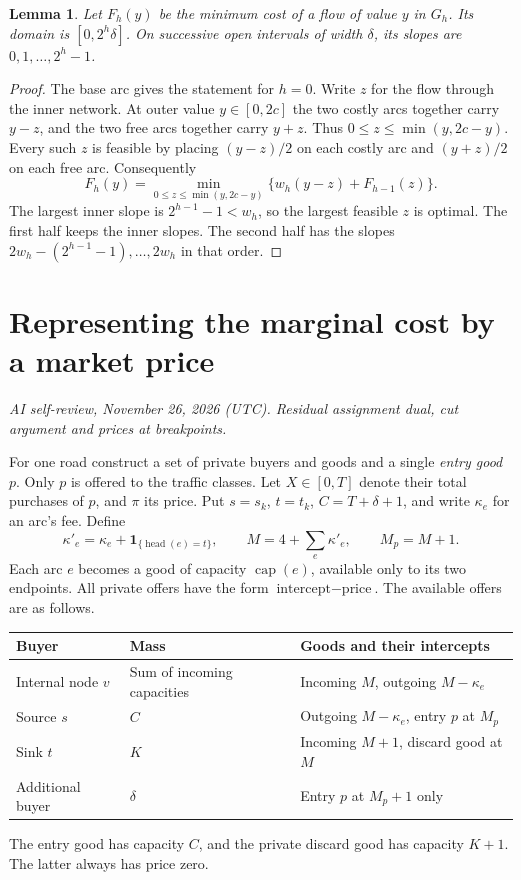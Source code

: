 \documentclass[11pt,oneside,openany,notitlepage]{report}
\newtheorem{lemma}[theorem]{Lemma}
\newcommand{\reviewdate}{November 26, 2026 (UTC)}
\newcommand{\reviewmark}[1]{\par\nopagebreak[4]\noindent
  {\footnotesize\itshape AI self-review, \reviewdate. #1\par}\nobreak\smallskip}
\DeclareMathOperator{\caparc}{cap}
\begin{document}
\begin{lemma}\label{lem:slopes}
Let \(F_h(y)\) be the minimum cost of a flow of value \(y\) in \(G_h\).
Its domain is \([0,2^h\delta]\). On successive open intervals of width
\(\delta\), its slopes are \(0,1,\ldots,2^h-1\).
\end{lemma}
\begin{proof}
The base arc gives the statement for \(h=0\). Write \(z\) for the flow
through the inner network. At outer value \(y\in[0,2c]\) the two costly
arcs together carry \(y-z\), and the two free arcs together carry \(y+z\).
Thus \(0\le z\le\min(y,2c-y)\). Every such \(z\) is feasible by placing
\((y-z)/2\) on each costly arc and \((y+z)/2\) on each free arc.
Consequently
\[
 F_h(y)=\min_{0\le z\le\min(y,2c-y)}
             \{w_h(y-z)+F_{h-1}(z)\}.
\]
The largest inner slope is \(2^{h-1}-1<w_h\), so the largest feasible \(z\)
is optimal. The first half keeps the inner slopes. The second half has the
slopes \(2w_h-(2^{h-1}-1),\ldots,2w_h\) in that order.
\end{proof}

\section{Representing the marginal cost by a market price}
\reviewmark{Residual assignment dual, cut argument and prices at breakpoints.}

For one road construct a set of private buyers and goods and a single
\emph{entry good} \(p\). Only \(p\) is offered to the traffic classes.
Let \(X\in[0,T]\) denote their total purchases of \(p\), and \(\pi\) its
price. Put \(s=s_k\), \(t=t_k\), \(C=T+\delta+1\), and write
\(\kappa_e\) for an arc's fee. Define
\[
 \kappa'_e=\kappa_e+\mathbf1_{\{\operatorname{head}(e)=t\}},
 \qquad M=4+\sum_e\kappa'_e,\qquad M_p=M+1.
\]
Each arc \(e\) becomes a good of capacity \(\caparc(e)\), available only
to its two endpoints. All private offers have the form
\(\text{intercept}-\text{price}\). The available offers are as follows.

\begin{center}
\small
\begin{tabular}{@{}lll@{}}
\toprule
Buyer & Mass & Goods and their intercepts\\
\midrule
Internal node \(v\) & Sum of incoming capacities &
  Incoming \(M\), outgoing \(M-\kappa_e\)\\
Source \(s\) & \(C\) & Outgoing \(M-\kappa_e\), entry \(p\) at \(M_p\)\\
Sink \(t\) & \(K\) & Incoming \(M+1\), discard good at \(M\)\\
Additional buyer & \(\delta\) & Entry \(p\) at \(M_p+1\) only\\
\bottomrule
\end{tabular}
\end{center}
The entry good has capacity \(C\), and the private discard good has
capacity \(K+1\). The latter always has price zero.
\end{document}

